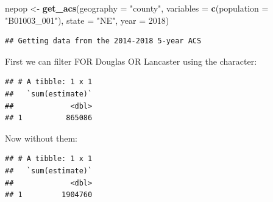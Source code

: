 \documentclass[]{book}
\newenvironment{Shaded}{\begin{snugshade}}{\end{snugshade}}
\newcommand{\DataTypeTok}[1]{\textcolor[rgb]{0.13,0.29,0.53}{#1}}
\newcommand{\DecValTok}[1]{\textcolor[rgb]{0.00,0.00,0.81}{#1}}
\newcommand{\KeywordTok}[1]{\textcolor[rgb]{0.13,0.29,0.53}{\textbf{#1}}}
\newcommand{\NormalTok}[1]{#1}
\newcommand{\OperatorTok}[1]{\textcolor[rgb]{0.81,0.36,0.00}{\textbf{#1}}}
\newcommand{\StringTok}[1]{\textcolor[rgb]{0.31,0.60,0.02}{#1}}
\begin{document}
\begin{Shaded}
\begin{Highlighting}[]
\NormalTok{nepop <-}\StringTok{ }\KeywordTok{get_acs}\NormalTok{(}\DataTypeTok{geography =} \StringTok{"county"}\NormalTok{, }
              \DataTypeTok{variables =} \KeywordTok{c}\NormalTok{(}\DataTypeTok{population =} \StringTok{"B01003_001"}\NormalTok{), }
              \DataTypeTok{state =} \StringTok{"NE"}\NormalTok{, }
              \DataTypeTok{year =} \DecValTok{2018}\NormalTok{)}
\end{Highlighting}
\end{Shaded}

\begin{verbatim}
## Getting data from the 2014-2018 5-year ACS
\end{verbatim}

First we can filter FOR Douglas OR Lancaster using the \textbar{} character:

\begin{Shaded}
\end{Shaded}

\begin{verbatim}
## # A tibble: 1 x 1
##   `sum(estimate)`
##             <dbl>
## 1          865086
\end{verbatim}

Now without them:

\begin{Shaded}
\end{Shaded}

\begin{verbatim}
## # A tibble: 1 x 1
##   `sum(estimate)`
##             <dbl>
## 1         1904760
\end{verbatim}
\end{document}
